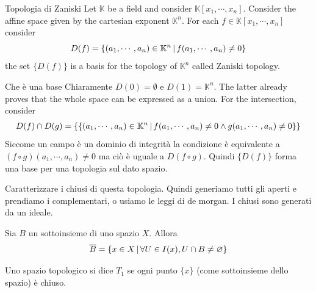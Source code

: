 \documentclass[a4paper]{article}
\begin{document}
\begin{snippetexample}{Topologia di Zaniski}
    Let \(\mathbb{K}\) be a field
    and consider \(\mathbb{K}[x_1, \cdots, x_n]\).
    Consider the affine space
    given by the cartesian exponent \(\mathbb{K}^n\).
    For each \(f \in \mathbb{K}[x_1, \cdots, x_n]\)
    consider
    \[
        D(f) = \{(a_1, \cdots, a_n) \in \mathbb{K}^n \,|\, f(a_1, \cdots, a_n) \neq 0\}
    \]
    the set \(\{D(f)\}\) is a basis for the topology of \(\mathbb{K}^n\)
    called Zaniski topology.
\end{snippetexample}

\begin{snippetproof}{Che è una base}
    Chiaramente \(D(0) = \emptyset\) e \(D(1) = \mathbb{K}^n\).
    The latter already proves that the whole space can be expressed as a union.
    For the intersection, consider
    \begin{align*}
        D(f) \cap D(g) = \{
            \{(a_1, \cdots, a_n) \in \mathbb{K}^n \,|\, f(a_1, \cdots, a_n) \neq 0 \land g(a_1, \cdots, a_n) \neq 0\}
        \}
    \end{align*}
    Siccome un campo è un dominio di integrità la condizione è equivalente a
    \((f \circ g)(a_1, \cdots, a_n) \neq 0\) ma ciò è uguale a \(D(f \circ g)\).
    Quindi \(\{D(f)\}\) forma una base per una topologia sul dato spazio.
\end{snippetproof}

\begin{snippetexercise}{}
    Caratterizzare i chiusi di questa topologia.
    Quindi generiamo tutti gli aperti e prendiamo i complementari,
    o usiamo le leggi di de morgan. I chiusi sono generati da un ideale.
\end{snippetexercise}

\begin{snippetproposition}{}
    Sia \(B\) un sottoinsieme di uno spazio \(X\).
    Allora
    \[
        \overline{B} = \{
            x \in X \,|\, \forall U \in I(x), U \cap B \neq \varnothing
        \}
    \]
\end{snippetproposition}

\begin{snippetproof}{}
    \todo
\end{snippetproof}

\begin{snippetdefinition}{}
    Uno spazio topologico si dice \(T_1\) se ogni punto \(\{x\}\)
    (come sottoinsieme dello spazio) è chiuso.
\end{snippetdefinition}
\end{document}
